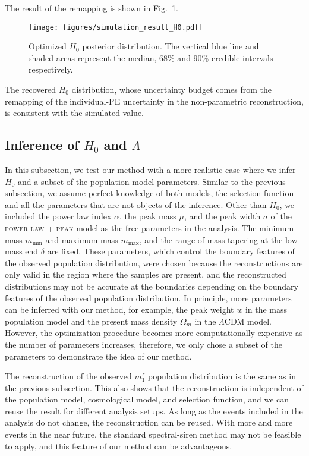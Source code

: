 \documentclass[sn-aps, pdflatex, iicol]{sn-jnl}
\begin{document}
The result of the remapping is shown in Fig.~\ref{fig:simulation_result_H0}.
\begin{figure}
    \texttt{[image: figures/simulation\_result\_H0.pdf]}
    \caption{
        Optimized $H_0$ posterior distribution.
        The vertical blue line and shaded areas represent the median, 68\% and 90\% credible intervals respectively.
    }
    \label{fig:simulation_result_H0}
\end{figure}
The recovered $H_0$ distribution, whose uncertainty budget comes from the remapping of the individual-\ac{PE} uncertainty in the non-parametric reconstruction, is consistent with the simulated value.

\subsection{Inference of $H_0$ and $\Lambda$}
\label{sec:inference_multi}

In this subsection, we test our method with a more realistic case where we infer $H_0$ and a subset of the population model parameters.
Similar to the previous subsection, we assume perfect knowledge of both models, the selection function and all the parameters that are not objects of the inference.
Other than $H_0$, we included the power law index $\alpha$, the peak mass $\mu$, and the peak width $\sigma$ of the \textsc{power law + peak} model as the free parameters in the analysis.
The minimum mass $m_\mathrm{min}$ and maximum mass $m_\mathrm{max}$, and the range of mass tapering at the low mass end $\delta$ are fixed.
These parameters, which control the boundary features of the observed population distribution, were chosen because the reconstructions are only valid in the region where the samples are present, and the reconstructed distributions may not be accurate at the boundaries depending on the boundary features of the observed population distribution.
In principle, more parameters can be inferred with our method, for example, the peak weight $w$ in the mass population model and the present mass density $\Omega_m$ in the $\Lambda$CDM model.
However, the optimization procedure becomes more computationally expensive as the number of parameters increases, therefore, we only chose a subset of the parameters to demonstrate the idea of our method.

The reconstruction of the observed $m^z_1$ population distribution is the same as in the previous subsection.
This also shows that the reconstruction is independent of the population model, cosmological model, and selection function, and we can reuse the result for different analysis setups.
As long as the events included in the analysis do not change, the reconstruction can be reused.
With more and more events in the near future, the standard spectral-siren method may not be feasible to apply, and this feature of our method can be advantageous.
\end{document}
